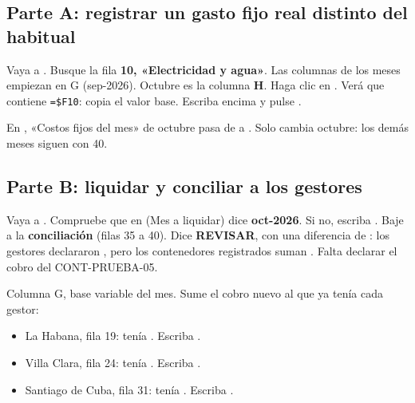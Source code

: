 \subsection*{Parte A: registrar un gasto fijo real distinto del habitual}
\begin{pasos}
\paso Vaya a . Busque la fila \textbf{10, «Electricidad y agua»}.
\paso Las columnas de los meses empiezan en G (sep-2026). Octubre es la columna \textbf{H}.
\paso Haga clic en . Verá que contiene \texttt{=\$F10}: copia el valor base. Escriba encima  y pulse .
\end{pasos}


\begin{resultado}
En , «Costos fijos del mes» de octubre pasa de \vEjCincoFijosOctAntes{} a \textbf{\vEjCincoFijosOct}. Solo cambia octubre: los demás meses siguen con 40.
\end{resultado}

\subsection*{Parte B: liquidar y conciliar a los gestores}
\begin{pasos}
\paso Vaya a . Compruebe que en  (Mes a liquidar) dice \textbf{oct-2026}. Si no, escriba .
\paso Baje a la \textbf{conciliación} (filas 35 a 40). Dice \textcolor{rojo}{\textbf{REVISAR}}, con una diferencia de
      \textcolor{red}{\vEjCincoDif}: los gestores declararon \vEjCincoDeclarada, pero los contenedores registrados suman \vEjCincoReal.
      Falta declarar el cobro del CONT-PRUEBA-05.
\end{pasos}


\begin{pasos}
\setcounter{paso}{2}
\paso Columna G, base variable del mes. Sume el cobro nuevo al que ya tenía cada gestor:
  \begin{itemize}
    \item La Habana, fila 19:  tenía \vEjCincoHabAntes. Escriba \escriba{\vEjCincoHab}.
    \item Villa Clara, fila 24:  tenía \vEjCincoVcAntes. Escriba \escriba{\vEjCincoVc}.
    \item Santiago de Cuba, fila 31:  tenía \vEjCincoScAntes. Escriba \escriba{\vEjCincoSc}.
  \end{itemize}
\end{pasos}

